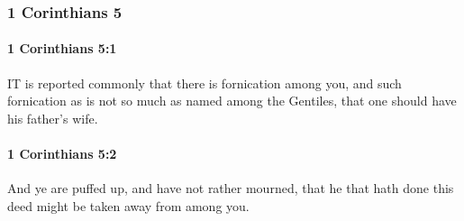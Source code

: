 	\subsubsection{1 Corinthians 5} %
		\label{1CORINTHIANS-5}
		
		\paragraph{1 Corinthians 5:1} %
			\label{1CORINTHIANS-5-1}

			IT is reported commonly that there is fornication among you, and such fornication as is not so much as named among the Gentiles, that one should have his father's wife.

			\begin{framed}
			\scriptsize
				\begin{compactdesc}
					\item[SBLG] 
				\end{compactdesc}
			\end{framed}

		\paragraph{1 Corinthians 5:2} %
			\label{1CORINTHIANS-5-2}

			And ye are puffed up, and have not rather mourned, that he that hath done this deed might be taken away from among you.

